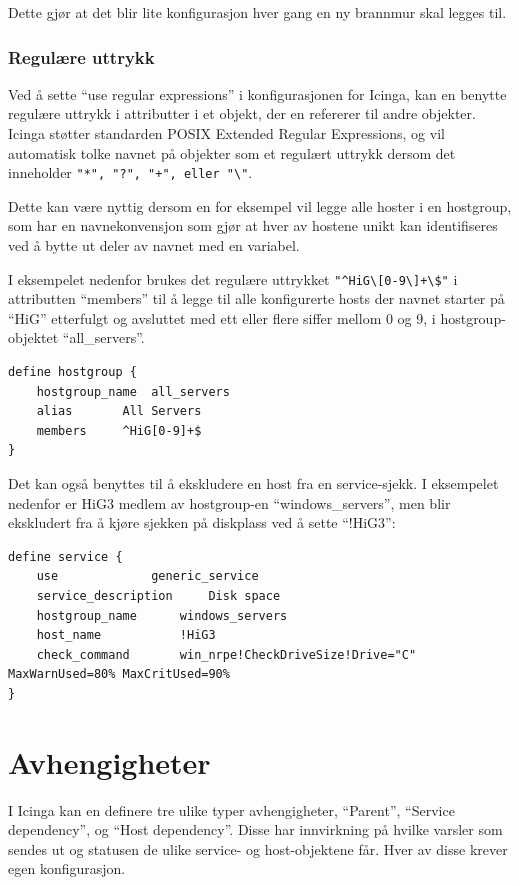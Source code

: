 Dette gjør at det blir lite konfigurasjon hver gang en ny brannmur skal legges til.

\subsubsection{Regulære uttrykk}
Ved å sette ``use regular expressions'' i konfigurasjonen for Icinga, kan en benytte regulære uttrykk i attributter i et objekt, der en refererer til andre objekter. Icinga støtter standarden POSIX Extended Regular Expressions, og vil automatisk tolke navnet på objekter som et regulært uttrykk dersom det inneholder \verb|"*", "?", "+", eller "\"|.

Dette kan være nyttig dersom en for eksempel vil legge alle hoster i en hostgroup, som har en navnekonvensjon som gjør at hver av hostene unikt kan identifiseres ved å bytte ut deler av navnet med en variabel.

I eksempelet nedenfor brukes det regulære uttrykket \verb|"^HiG\[0-9\]+\$"| i attributten ``members'' til å legge til alle konfigurerte hosts der navnet starter på ``HiG'' etterfulgt og avsluttet med ett eller flere siffer mellom 0 og 9, i hostgroup-objektet ``all\_servers''.
\begin{lstlisting}[style=example]
define hostgroup {
    hostgroup_name	all_servers
    alias		All Servers
    members		^HiG[0-9]+$
}
\end{lstlisting}

Det kan også benyttes til å ekskludere en host fra en service-sjekk. I eksempelet nedenfor er HiG3 medlem av hostgroup-en ``windows\_servers'', men blir ekskludert fra å kjøre sjekken på diskplass ved å sette ``!HiG3'':
\begin{lstlisting}[style=example]
define service {
    use				generic_service
    service_description		Disk space
    hostgroup_name		windows_servers
    host_name			!HiG3
    check_command		win_nrpe!CheckDriveSize!Drive="C" MaxWarnUsed=80% MaxCritUsed=90%
}
\end{lstlisting}

\section{Avhengigheter}
I Icinga kan en definere tre ulike typer avhengigheter, ``Parent'', ``Service dependency'', og ``Host dependency''. Disse har innvirkning på hvilke varsler som sendes ut og statusen de ulike service- og host-objektene får. Hver av disse krever egen konfigurasjon. 

